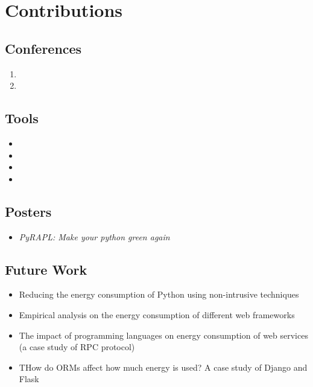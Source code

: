 \clearpage
\section{Contributions}

\subsection*{Conferences}
\nobibliography*
\begin{enumerate}
    \item {}
    \item {}
\end{enumerate}

\subsection*{Tools}
\begin{itemize}
    \item {}
    \item {}
    \item {}
    \item {}
\end{itemize}

\subsection*{Posters}
\begin{itemize}
    \item \emph{PyRAPL\@: Make your python green again}
\end{itemize}
\subsection*{Future Work}
\begin{itemize}
    \item Reducing the energy consumption of Python using non-intrusive techniques
    \item Empirical analysis on the energy consumption of different web frameworks
    \item The impact of programming languages on energy consumption of web services (a case study of RPC protocol)
    \item THow do ORMs affect how much energy is used? A case study of Django and Flask
\end{itemize}


\cleardoublepage
